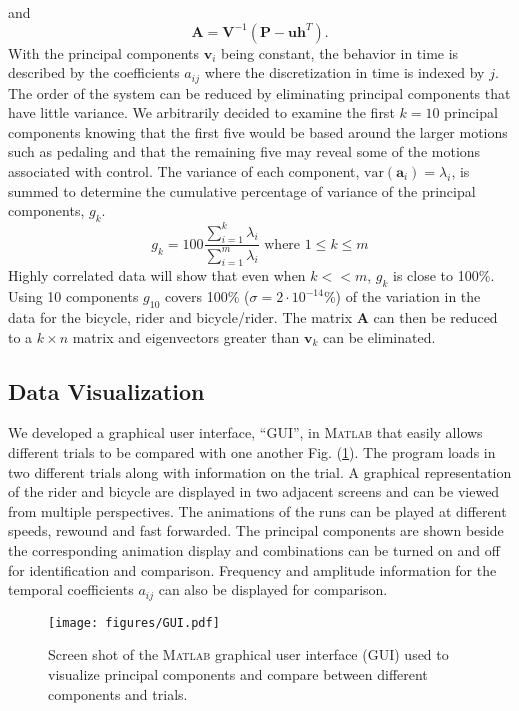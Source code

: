 and
\begin{equation}
    \mathbf{A}=\mathbf{V}^{-1}(\mathbf{P}-\mathbf{u}\mathbf{h}^T)\textrm{.}
\end{equation}
With the principal components $\mathbf{v}_i$ being constant, the behavior in
time is described by the coefficients $a_{ij}$ where the discretization in time
is indexed by $j$. The order of the system can be reduced by eliminating
principal components that have little variance. We arbitrarily decided to
examine the first $k=10$ principal components knowing that the first five would
be based around the larger motions such as pedaling and that the remaining five
may reveal some of the motions associated with control. The variance of each
component, $\textrm{var}(\mathbf{a}_i)=\lambda_i$, is summed to determine the
cumulative percentage of variance of the principal components, $g_k$.
\begin{equation}
    g_k=100\frac{\sum_{i=1}^k\lambda_i}{\sum_{i=1}^m\lambda_i}\textrm{ where }1\leq k\leq m
\end{equation}
Highly correlated data will show that even when $k<<m$, $g_k$ is close to
100\%. Using 10 components $g_{10}$ covers 100\% ($\sigma=2\cdot10^{-14}$\%) of
the variation in the data for the bicycle, rider and bicycle/rider. The matrix
$\mathbf{A}$ can then be reduced to a $k\times n$ matrix and eigenvectors
greater than $\mathbf{v}_k$ can be eliminated.

\subsection{Data Visualization}
\label{sec:dataVis}
We developed a graphical user interface, ``GUI'',  in \textsc{Matlab} that easily allows
different trials to be compared with one another Fig. (\ref{fig:GUI}). The
program loads in two different trials along with information on the trial. A
graphical representation of the rider and bicycle are displayed in two adjacent
screens and can be viewed from multiple perspectives. The animations of the
runs can be played at different speeds, rewound and fast forwarded. The
principal components are shown beside the corresponding animation display and
combinations can be turned on and off for identification and comparison.
Frequency and amplitude information for the temporal coefficients $a_{ij}$ can
also be displayed for comparison.
\begin{figure}[tbp]
    \begin{center}
        \texttt{[image: figures/GUI.pdf]}
    \end{center}
    \caption{Screen shot of the \textsc{Matlab} graphical user interface (GUI)
    used to visualize principal components and compare between different
    components and trials.}
    \label{fig:GUI}
\end{figure}

